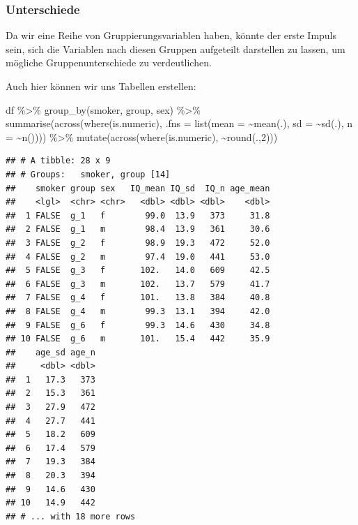 \documentclass[
]{book}
\newenvironment{Shaded}{\begin{snugshade}}{\end{snugshade}}
\newcommand{\AttributeTok}[1]{\textcolor[rgb]{0.77,0.63,0.00}{#1}}
\newcommand{\DecValTok}[1]{\textcolor[rgb]{0.00,0.00,0.81}{#1}}
\newcommand{\FunctionTok}[1]{\textcolor[rgb]{0.00,0.00,0.00}{#1}}
\newcommand{\NormalTok}[1]{#1}
\newcommand{\SpecialCharTok}[1]{\textcolor[rgb]{0.00,0.00,0.00}{#1}}
\begin{document}
\hypertarget{unterschiede}{%
\subsubsection{Unterschiede}\label{unterschiede}}

Da wir eine Reihe von Gruppierungsvariablen haben, könnte der erste Impuls sein, sich die Variablen nach diesen Gruppen aufgeteilt darstellen zu lassen, um mögliche Gruppenunterschiede zu verdeutlichen.

Auch hier können wir uns Tabellen erstellen:

\begin{Shaded}
\begin{Highlighting}[]
\NormalTok{df }\SpecialCharTok{\%\textgreater{}\%} 
  \FunctionTok{group\_by}\NormalTok{(smoker, group, sex) }\SpecialCharTok{\%\textgreater{}\%} 
  \FunctionTok{summarise}\NormalTok{(}\FunctionTok{across}\NormalTok{(}\FunctionTok{where}\NormalTok{(is.numeric),}
                   \AttributeTok{.fns =} \FunctionTok{list}\NormalTok{(}\AttributeTok{mean =} \SpecialCharTok{\textasciitilde{}}\FunctionTok{mean}\NormalTok{(.),}
                               \AttributeTok{sd =} \SpecialCharTok{\textasciitilde{}}\FunctionTok{sd}\NormalTok{(.),}
                               \AttributeTok{n =} \SpecialCharTok{\textasciitilde{}}\FunctionTok{n}\NormalTok{()))) }\SpecialCharTok{\%\textgreater{}\%} 
  \FunctionTok{mutate}\NormalTok{(}\FunctionTok{across}\NormalTok{(}\FunctionTok{where}\NormalTok{(is.numeric),}
                \SpecialCharTok{\textasciitilde{}}\FunctionTok{round}\NormalTok{(.,}\DecValTok{2}\NormalTok{)))}
\end{Highlighting}
\end{Shaded}

\begin{verbatim}
## # A tibble: 28 x 9
## # Groups:   smoker, group [14]
##    smoker group sex   IQ_mean IQ_sd  IQ_n age_mean
##    <lgl>  <chr> <chr>   <dbl> <dbl> <dbl>    <dbl>
##  1 FALSE  g_1   f        99.0  13.9   373     31.8
##  2 FALSE  g_1   m        98.4  13.9   361     30.6
##  3 FALSE  g_2   f        98.9  19.3   472     52.0
##  4 FALSE  g_2   m        97.4  19.0   441     53.0
##  5 FALSE  g_3   f       102.   14.0   609     42.5
##  6 FALSE  g_3   m       102.   13.7   579     41.7
##  7 FALSE  g_4   f       101.   13.8   384     40.8
##  8 FALSE  g_4   m        99.3  13.1   394     42.0
##  9 FALSE  g_6   f        99.3  14.6   430     34.8
## 10 FALSE  g_6   m       101.   15.4   442     35.9
##    age_sd age_n
##     <dbl> <dbl>
##  1   17.3   373
##  2   15.3   361
##  3   27.9   472
##  4   27.7   441
##  5   18.2   609
##  6   17.4   579
##  7   19.3   384
##  8   20.3   394
##  9   14.6   430
## 10   14.9   442
## # ... with 18 more rows
\end{verbatim}
\end{document}
